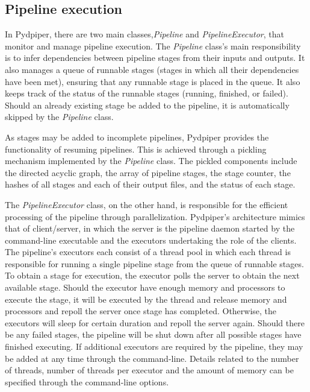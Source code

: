 \documentclass{report}
\begin{document}
        \subsection{Pipeline execution}
        
        In Pydpiper, there are two main classes,\textit{Pipeline} and \textit{PipelineExecutor}, 
that monitor and manage pipeline execution. The \textit{Pipeline} class's main responsibility
is to infer dependencies between pipeline stages from their inputs and outputs. It also manages
a queue of runnable stages (stages in which all their dependencies have been met), ensuring
that any runnable stage is placed in the queue. It also keeps track of the status of the runnable
stages (running, finished, or failed). Should an already existing stage be added to the pipeline, it
is automatically skipped by the \textit{Pipeline} class. 

        As stages may be added to incomplete pipelines, Pydpiper provides the functionality of resuming
pipelines. This is achieved through a pickling mechanism implemented by the \textit{Pipeline} class. The
pickled components include the directed acyclic graph, the array of pipeline stages, the stage counter,
the hashes of all stages and each of their output files, and the status of each stage.

        The \textit{PipelineExecutor} class, on the other hand, is responsible for the efficient processing
of the pipeline through parallelization. Pydpiper's architecture mimics that of client/server, in which the 
server is the pipeline daemon started by the command-line executable and the executors undertaking the role of 
the clients. The pipeline's executors each consist of a thread pool in which each
thread is responsible for running a single pipeline stage from the queue of runnable stages. To
obtain a stage for execution, the executor polls the server to obtain the next available stage. Should
the executor have enough memory and processors to execute the stage, it will be executed by the thread
and release memory and processors and repoll the server once stage has completed.
Otherwise, the executors will sleep for certain duration and repoll the server again. 
Should there be any failed stages, the pipeline will be shut down after all possible stages have finished 
executing. If additional executors are required by the pipeline, they may be added at any time through
the command-line. Details related to
the number of threads, number of threads per executor and the amount of memory can be specified through the
command-line options. 
\end{document}

